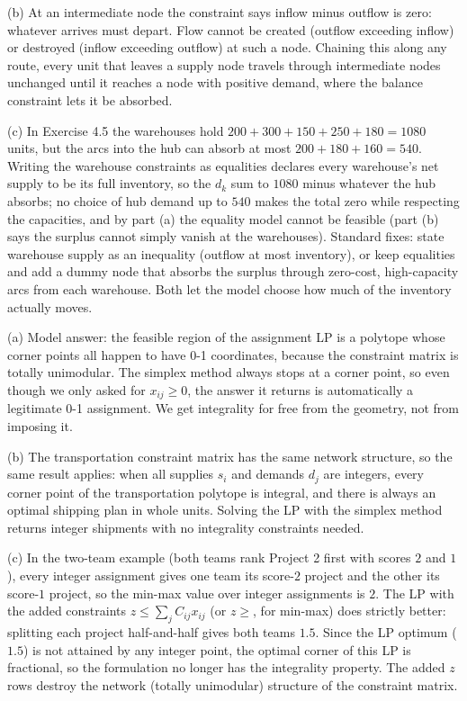 (b) At an intermediate node the constraint says inflow minus outflow is zero: whatever arrives must depart. Flow cannot be created (outflow exceeding inflow) or destroyed (inflow exceeding outflow) at such a node. Chaining this along any route, every unit that leaves a supply node travels through intermediate nodes unchanged until it reaches a node with positive demand, where the balance constraint lets it be absorbed.

(c) In Exercise 4.5 the warehouses hold $200 + 300 + 150 + 250 + 180 = 1080$ units, but the arcs into the hub can absorb at most $200 + 180 + 160 = 540$. Writing the warehouse constraints as equalities declares every warehouse's net supply to be its full inventory, so the $d_k$ sum to $1080$ minus whatever the hub absorbs; no choice of hub demand up to $540$ makes the total zero while respecting the capacities, and by part (a) the equality model cannot be feasible (part (b) says the surplus cannot simply vanish at the warehouses). Standard fixes: state warehouse supply as an inequality (outflow at most inventory), or keep equalities and add a dummy node that absorbs the surplus through zero-cost, high-capacity arcs from each warehouse. Both let the model choose how much of the inventory actually moves.


(a) Model answer: the feasible region of the assignment LP is a polytope whose corner points all happen to have 0-1 coordinates, because the constraint matrix is totally unimodular. The simplex method always stops at a corner point, so even though we only asked for $x_{ij} \geq 0$, the answer it returns is automatically a legitimate 0-1 assignment. We get integrality for free from the geometry, not from imposing it.

(b) The transportation constraint matrix has the same network structure, so the same result applies: when all supplies $s_i$ and demands $d_j$ are integers, every corner point of the transportation polytope is integral, and there is always an optimal shipping plan in whole units. Solving the LP with the simplex method returns integer shipments with no integrality constraints needed.

(c) In the two-team example (both teams rank Project 2 first with scores $2$ and $1$), every integer assignment gives one team its score-$2$ project and the other its score-$1$ project, so the min-max value over integer assignments is $2$. The LP with the added constraints $z \leq \sum_j C_{ij} x_{ij}$ (or $z \geq$, for min-max) does strictly better: splitting each project half-and-half gives both teams $1.5$. Since the LP optimum ($1.5$) is not attained by any integer point, the optimal corner of this LP is fractional, so the formulation no longer has the integrality property. The added $z$ rows destroy the network (totally unimodular) structure of the constraint matrix.

